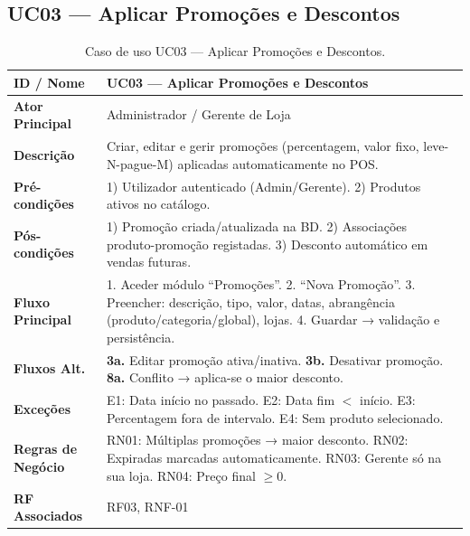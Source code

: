 \documentclass[a4paper,12pt]{scrreprt}
\begin{document}
\subsection*{UC03 --- Aplicar Promoções e Descontos}
\begin{table}[H]
\centering\small
\begin{tabular}{|p{3cm}|p{11cm}|}
\hline
\textbf{ID / Nome} & UC03 --- Aplicar Promoções e Descontos \\
\hline
\textbf{Ator Principal} & Administrador / Gerente de Loja \\
\hline
\textbf{Descrição} & Criar, editar e gerir promoções (percentagem, valor fixo, leve-N-pague-M) aplicadas automaticamente no POS. \\
\hline
\textbf{Pré-condições} & 1) Utilizador autenticado (Admin/Gerente). 2) Produtos ativos no catálogo. \\
\hline
\textbf{Pós-condições} & 1) Promoção criada/atualizada na BD. 2) Associações produto-promoção registadas. 3) Desconto automático em vendas futuras. \\
\hline
\textbf{Fluxo Principal} & 1. Aceder módulo ``Promoções''. 2. ``Nova Promoção''. 3. Preencher: descrição, tipo, valor, datas, abrangência (produto/categoria/global), lojas. 4. Guardar → validação e persistência. \\
\hline
\textbf{Fluxos Alt.} & \textbf{3a.} Editar promoção ativa/inativa. \textbf{3b.} Desativar promoção. \textbf{8a.} Conflito → aplica-se o maior desconto. \\
\hline
\textbf{Exceções} & E1: Data início no passado. E2: Data fim $<$ início. E3: Percentagem fora de intervalo. E4: Sem produto selecionado. \\
\hline
\textbf{Regras de Negócio} & RN01: Múltiplas promoções → maior desconto. RN02: Expiradas marcadas automaticamente. RN03: Gerente só na sua loja. RN04: Preço final $\geq 0$. \\
\hline
\textbf{RF Associados} & RF03, RNF-01 \\
\hline
\end{tabular}
\caption{Caso de uso UC03 --- Aplicar Promoções e Descontos.}
\end{table}

\end{document}
